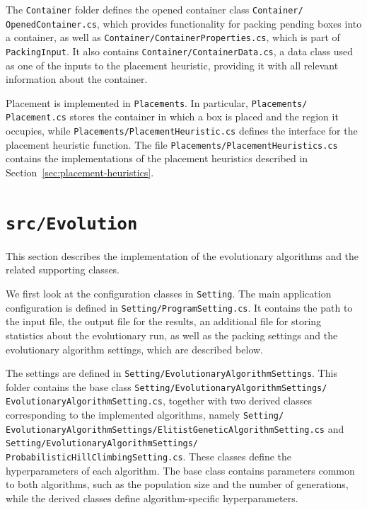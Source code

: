 The \texttt{Container} folder defines the opened container class \texttt{Container/\\OpenedContainer.cs}, 
which provides functionality for packing pending boxes into a container, as well as \texttt{Container/ContainerProperties.cs}, 
which is part of \texttt{PackingInput}. It also contains \texttt{Container/ContainerData.cs}, a data class used 
as one of the inputs to the placement heuristic, providing it with all relevant information about the container.

Placement is implemented in \texttt{Placements}. In particular, \texttt{Placements/\\Placement.cs} 
stores the container in which a box is placed and the region it occupies, while \texttt{Placements/PlacementHeuristic.cs} 
defines the interface for the placement heuristic function. The file \texttt{Placements/PlacementHeuristics.cs} 
contains the implementations of the placement heuristics described in Section~\ref{sec:placement-heuristics}.

\section{\texttt{src/Evolution}}

This section describes the implementation of the evolutionary algorithms and the related supporting classes.

We first look at the configuration classes in \texttt{Setting}. 
The main application configuration is defined in \texttt{Setting/ProgramSetting.cs}. 
It contains the path to the input file, the output file for the results, 
an additional file for storing statistics about the evolutionary run, 
as well as the packing settings and the evolutionary algorithm settings, which are described below.

The settings are defined in \texttt{Setting/EvolutionaryAlgorithmSettings}. 
This folder contains the base class \texttt{Setting/EvolutionaryAlgorithmSettings/\\EvolutionaryAlgorithmSetting.cs}, 
together with two derived classes corresponding to the implemented algorithms, 
namely \texttt{Setting/\\EvolutionaryAlgorithmSettings/ElitistGeneticAlgorithmSetting.cs} 
and \texttt{Setting/EvolutionaryAlgorithmSettings/\\ProbabilisticHillClimbingSetting.cs}. 
These classes define the hyperparameters of each algorithm. 
The base class contains parameters common to both algorithms, such as the population size and the number of generations, 
while the derived classes define algorithm-specific hyperparameters.

